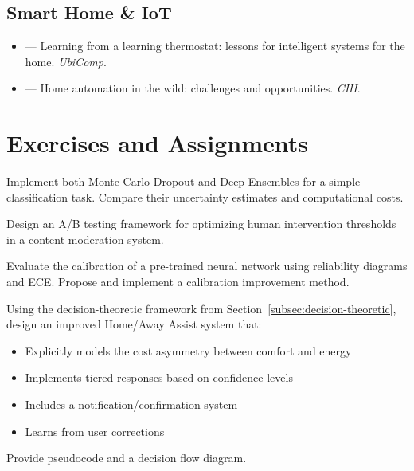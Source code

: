 \subsection{Smart Home \& IoT}
\begin{itemize}
    \item \textcite{yang2013learning} --- Learning from a learning thermostat: lessons for intelligent systems for the home. \emph{UbiComp}.
    \item \textcite{brush2011home} --- Home automation in the wild: challenges and opportunities. \emph{CHI}.
\end{itemize}

\section{Exercises and Assignments}

\begin{Exercise}
Implement both Monte Carlo Dropout and Deep Ensembles for a simple classification task. Compare their uncertainty estimates and computational costs.
\end{Exercise}

\begin{Exercise}
Design an A/B testing framework for optimizing human intervention thresholds in a content moderation system.
\end{Exercise}

\begin{Exercise}
Evaluate the calibration of a pre-trained neural network using reliability diagrams and ECE. Propose and implement a calibration improvement method.
\end{Exercise}

\begin{Exercise}
Using the decision-theoretic framework from Section~\ref{subsec:decision-theoretic}, design an improved Home/Away Assist system that:
\begin{itemize}
    \item Explicitly models the cost asymmetry between comfort and energy
    \item Implements tiered responses based on confidence levels
    \item Includes a notification/confirmation system
    \item Learns from user corrections
\end{itemize}
Provide pseudocode and a decision flow diagram.
\end{Exercise}

